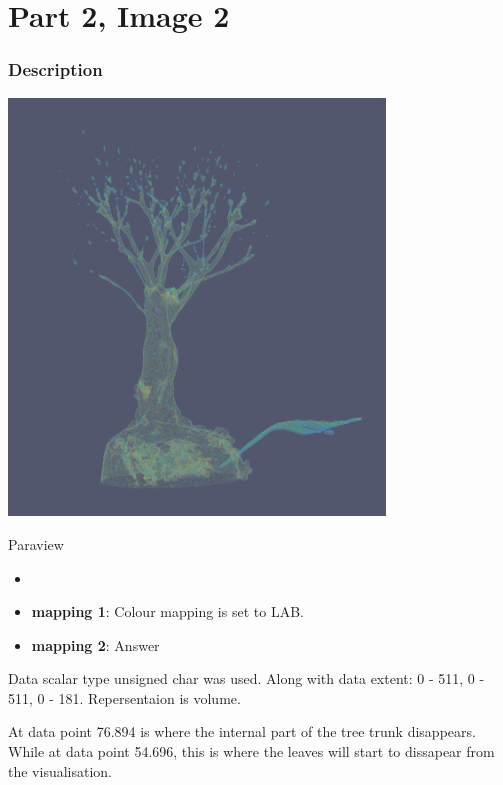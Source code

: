\hypertarget{part-2-image-2}{%
\section{Part 2, Image 2}\label{part-1-design-3}}

\centering


\hypertarget{description}{%
	\subsubsection{Description}\label{description}}

\begin{description}
	\item[Image:]
	\item\includegraphics[width=10cm]{Tree2.png}
	\item[Tool:]
	Paraview
	\item[Visual Mappings:]
	\begin{itemize}
		\tightlist
		\item[ ]
	\end{itemize}
	\begin{itemize}
		\tightlist
		\item
		\textbf{mapping 1}: Colour mapping is set to LAB.
	\end{itemize}
	
	\begin{itemize}
		\tightlist
		\item
		\textbf{mapping 2}: Answer
	\end{itemize}
	\item[Data Conversion:] Data scalar type unsigned char was used. Along with data extent: 0 - 511, 0 - 511, 0 - 181. Repersentaion is volume.
	\item[Unique Observation:]
	At data point 76.894 is where the internal part of the tree trunk disappears. While at data point 54.696, this is where the leaves will start to dissapear from the visualisation.

\end{description}